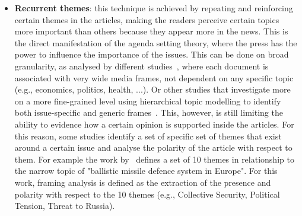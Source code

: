 \begin{itemize}
    \item \textbf{Recurrent themes}: this technique is achieved by repeating and reinforcing certain themes in the articles, making the readers perceive certain topics more important than others because they appear more in the news. This is the direct manifestation of the agenda setting theory, where the press has the power to influence the importance of the issues.
    This can be done on broad granularity, as analysed by different studies~\cite{tsur2015frame,card2015media}, where each document is associated with very wide media frames, not dependent on any specific topic (e.g., economics, politics, health, ...).
    Or other studies that investigate more on a more fine-grained level using hierarchical topic modelling to identify both issue-specific and generic frames~\cite{boydstun2013making}.
    This, however, is still limiting the ability to evidence how a certain opinion is supported inside the articles. For this reason, some studies identify a set of specific set of themes that exist around a certain issue and analyse the polarity of the article with respect to them. For example the work by~\citet{morstatter2018identifying} defines a set of 10 themes in relationship to the narrow topic of "ballistic missile defence system in Europe". For this work, framing analysis is defined as the extraction of the presence and polarity with respect to the 10 themes (e.g., Collective Security, Political Tension, Threat to Russia).
    
    

\end{itemize}
